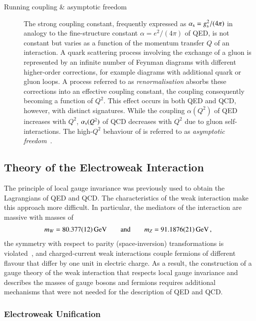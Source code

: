 \begin{description}
\item[Running coupling \& asymptotic freedom] The strong coupling constant,
  frequently expressed as $\alpha_{\text{s}} = g_{\text{s}}^2 / (4 \pi)$ in analogy to the
  fine-structure constant $\alpha = e^2 / (4 \pi)$ of QED, is not constant but
  varies as a function of the momentum transfer $Q$ of an interaction. A quark
  scattering process involving the exchange of a gluon is represented by an
  infinite number of Feynman diagrams with different higher-order corrections,
  for example diagrams with additional quark or gluon loops. A process referred
  to as \emph{renormalisation} absorbs these corrections into an effective
  coupling constant, the coupling consequently becoming a function of
  $Q^2$. This effect occurs in both QED and QCD, however, with distinct
  signatures. While the coupling $\alpha(Q^2)$ of QED increases with $Q^2$,
  $\alpha_{\text{s}}(Q^2)$ of QCD decreases with $Q^2$ due to gluon self-interactions. The
  high-$Q^2$ behaviour of \alphas is referred to as \emph{asymptotic
    freedom}~\cite{Gross:1973id,Politzer:1973fx}.
\end{description}


\subsection{Theory of the Electroweak Interaction}%
\label{seq:theory_ewk}

The principle of local gauge invariance was previously used to obtain the
Lagrangians of QED and QCD. The characteristics of the weak interaction make
this approach more difficult. In particular, the mediators of the interaction
are massive with masses of~\cite{pdg2020}
\begin{align*}
  m_W = \SI{80.377 +- 0.012}{\ensuremath{\text{GeV}}}
  \qquad \text{and} \qquad
  m_{Z} = \SI{91.1876 +- 0.0021}{\ensuremath{\text{GeV}}} \,\text{,}
\end{align*}
the symmetry with respect to parity (space-inversion) transformations is
violated~\cite{Wu:1957my}, and charged-current weak interactions couple fermions
of different flavour that differ by one unit in electric charge. As a result,
the construction of a gauge theory of the weak interaction that respects local
gauge invariance and describes the masses of gauge bosons and fermions requires
additional mechanisms that were not needed for the description of QED and QCD.


\subsubsection{Electroweak Unification}

